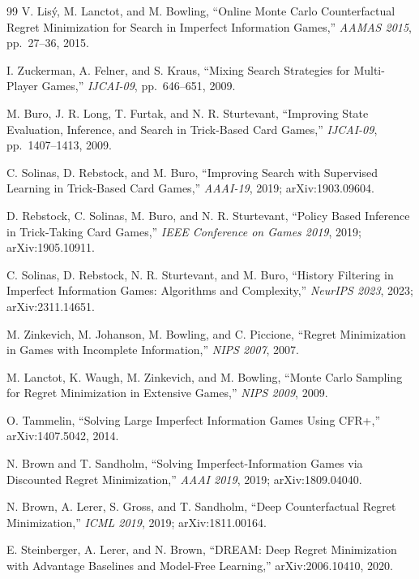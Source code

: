 \documentclass[11pt]{article}
\theoremstyle{definition}
\begin{document}
\begin{thebibliography}{99}
V. Lis\'y, M. Lanctot, and M. Bowling, ``Online Monte Carlo Counterfactual
Regret Minimization for Search in Imperfect Information Games,''
\emph{AAMAS 2015}, pp.~27--36, 2015.

I. Zuckerman, A. Felner, and S. Kraus, ``Mixing Search Strategies for
Multi-Player Games,'' \emph{IJCAI-09}, pp.~646--651, 2009.

M. Buro, J. R. Long, T. Furtak, and N. R. Sturtevant, ``Improving State
Evaluation, Inference, and Search in Trick-Based Card Games,'' \emph{IJCAI-09},
pp.~1407--1413, 2009.

C. Solinas, D. Rebstock, and M. Buro, ``Improving Search with Supervised
Learning in Trick-Based Card Games,'' \emph{AAAI-19}, 2019; arXiv:1903.09604.

D. Rebstock, C. Solinas, M. Buro, and N. R. Sturtevant, ``Policy Based Inference
in Trick-Taking Card Games,'' \emph{IEEE Conference on Games 2019}, 2019;
arXiv:1905.10911.

C. Solinas, D. Rebstock, N. R. Sturtevant, and M. Buro, ``History Filtering in
Imperfect Information Games: Algorithms and Complexity,'' \emph{NeurIPS 2023},
2023; arXiv:2311.14651.


M. Zinkevich, M. Johanson, M. Bowling, and C. Piccione, ``Regret Minimization in
Games with Incomplete Information,'' \emph{NIPS 2007}, 2007.

M. Lanctot, K. Waugh, M. Zinkevich, and M. Bowling, ``Monte Carlo Sampling for
Regret Minimization in Extensive Games,'' \emph{NIPS 2009}, 2009.

O. Tammelin, ``Solving Large Imperfect Information Games Using CFR+,''
arXiv:1407.5042, 2014.

N. Brown and T. Sandholm, ``Solving Imperfect-Information Games via Discounted
Regret Minimization,'' \emph{AAAI 2019}, 2019; arXiv:1809.04040.

N. Brown, A. Lerer, S. Gross, and T. Sandholm, ``Deep Counterfactual Regret
Minimization,'' \emph{ICML 2019}, 2019; arXiv:1811.00164.

E. Steinberger, A. Lerer, and N. Brown, ``DREAM: Deep Regret Minimization with
Advantage Baselines and Model-Free Learning,'' arXiv:2006.10410, 2020.


\end{thebibliography}
\end{document}
